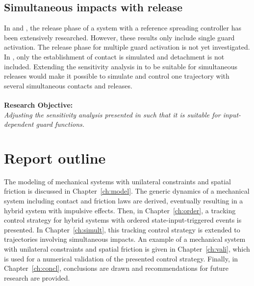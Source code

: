 \documentclass[../DC2017114Bouma.tex]{subfiles}
\begin{document}
\subsection*{Simultaneous impacts with release}
In \cite{Rijnen2016} and \cite{Rijn2016}, the release phase of a system with a reference spreading controller has been extensively researched. However, these results only include single guard activation. The release phase for multiple guard activation is not yet investigated. In \cite{Chen2018a}, only the establishment of contact is simulated and detachment is not included. Extending the sensitivity analysis in \cite{Chen2018a} to be suitable for simultaneous releases would make it possible to simulate and control one trajectory with several simultaneous contacts and releases.\\\\
\textbf{Research Objective:}\\
\textit{Adjusting the sensitivity analysis presented in \cite{Chen2018a} such that it is suitable for input-dependent guard functions.}
\section{Report outline}
The modeling of mechanical systems with unilateral constraints and spatial friction is discussed in Chapter~\ref{ch:model}. The generic dynamics of a mechanical system including contact and friction laws are derived, eventually resulting in a hybrid system with impulsive effects. Then, in Chapter~\ref{ch:order}, a tracking control strategy for hybrid systems with ordered state-input-triggered events is presented. In Chapter~\ref{ch:simult}, this tracking control strategy is extended to trajectories involving simultaneous impacts. An example of a mechanical system with unilateral constraints and spatial friction is given in Chapter~\ref{ch:vali}, which is used for a numerical validation of the presented control strategy. Finally, in Chapter~\ref{ch:concl}, conclusions are drawn and recommendations for future research are provided.
\end{document}
